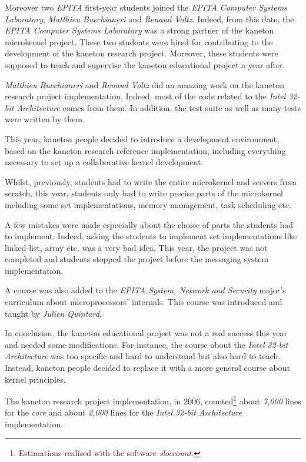 \begin{multicols}{2}
Moreover two \textit{EPITA} first-year students joined the \textit{EPITA
Computer Systems Laboratory}, \textit{Matthieu Bucchianeri} and \textit{Renaud
Voltz}. Indeed, from this date, the \textit{EPITA Computer Systems Laboratory}
was a strong partner of the kaneton microkernel project. These two students
were hired for contributing to the development of the kaneton research project.
Moreover, these students were supposed to teach and supervise the kaneton
educational project a year after.

\textit{Matthieu Bucchianeri} and \textit{Renaud Voltz} did an amazing work
on the kaneton research project implementation. Indeed, most of the
code related to the \textit{Intel 32-bit Architecture} comes from them. In
addition, the test suite as well as many tests were written by them.

This year, kaneton people decided to introduce a development environment,
based on the kaneton research reference implementation, including everything
necessary to set up a collaborative kernel development.

Whilst, previously, students had to write the entire microkernel and
servers from scratch, this year, students only had to write precise parts
of the microkernel including some set implementations, memory management,
task scheduling etc.

A few mistakes were made especially about the choice of parts the students
had to implement. Indeed, asking the students to implement set implementations
like linked-list, array etc. was a very bad idea. This year, the project
was not completed and students stopped the project before the messaging
system implementation.

A course was also added to the \textit{EPITA} \textit{System, Network
and Security} major's curriculum about microprocessors' internals. This
course was introduced and taught by \textit{Julien Quintard}.

In conclusion, the kaneton educational project was not a real success this year
and needed some modifications. For instance, the course about the \textit{Intel
32-bit Architecture} was too specific and hard to understand but also hard
to teach. Instead, kaneton people decided to replace it with a more general
course about kernel principles.

The kaneton research project implementation, in 2006,
  counted\footnote{Estimations realised with the software \textit{sloccount}.}
about \textit{7,000} lines for the \textit{core} and about \textit{2,000}
lines for the \textit{Intel 32-bit Architecture} implementation.


\end{multicols}
